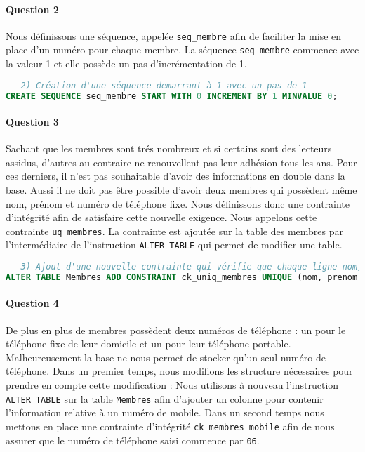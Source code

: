 \documentclass[10pt, oneside]{article}
\begin{document}

\paragraph{Question 2} Nous définissons une séquence, appelée \texttt{seq\_membre} afin de faciliter la mise en place d'un numéro pour chaque membre. La séquence \texttt{seq\_membre} commence avec la valeur 1 et elle possède un pas d'incrémentation de 1.

\begin{lstlisting}[language=sql, title=Question 2, label=QI2]
-- 2) Création d'une séquence demarrant à 1 avec un pas de 1
CREATE SEQUENCE seq_membre START WITH 0 INCREMENT BY 1 MINVALUE 0;
\end{lstlisting}


\paragraph{Question 3} Sachant que les membres sont trés nombreux et si certains sont des lecteurs assidus, d'autres au contraire ne renouvellent pas leur adhésion tous les ans. Pour ces derniers, il n'est pas souhaitable d'avoir des informations en double dans la base. Aussi il ne doit pas être possible d'avoir deux membres qui possèdent même nom, prénom et numéro de téléphone fixe. Nous définissons donc une contrainte d'intégrité afin de satisfaire cette nouvelle exigence. Nous appelons cette contrainte \texttt{uq\_membres}. La contrainte est ajoutée sur la table des membres par l'intermédiaire de l'instruction \texttt{ALTER TABLE} qui permet de modifier une table.

\begin{lstlisting}[language=sql, title=Question 3, label=QI3]
-- 3) Ajout d'une nouvelle contrainte qui vérifie que chaque ligne nom, prenom et telephone est unique
ALTER TABLE Membres ADD CONSTRAINT ck_uniq_membres UNIQUE (nom, prenom, telephone);
\end{lstlisting}


\paragraph{Question 4} De plus en plus de membres possèdent deux numéros de téléphone : un pour le téléphone fixe de leur domicile et un pour leur téléphone portable. Malheureusement la base ne nous permet de stocker qu'un seul numéro de téléphone.
Dans un premier temps, nous modifions les structure nécessaires pour prendre en compte cette modification : Nous utilisons à nouveau l'instruction \texttt{ALTER TABLE} sur la table \texttt{Membres} afin d'ajouter un colonne pour contenir l'information relative à un numéro de mobile. Dans un second temps nous mettons en place une contrainte d'intégrité \texttt{ck\_membres\_mobile} afin de nous assurer que le numéro de téléphone saisi commence par \texttt{06}.
\end{document}
